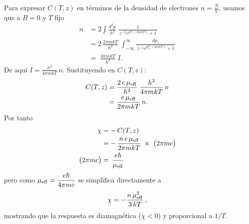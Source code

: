 \documentclass{report}
\begin{document}
Para expresar \(C(T,z)\) en términos de la densidad de electrones
\(\displaystyle n=\frac{N}{V}\), usamos que a \(B=0\) y \(T\) fijo
\begin{align*}
n
  &=2\int\frac{d^3p}{h^3}\;\frac{1}{\,z^{-1}e^{p^2/(2mkT)}+1\,}\\
  &=2\,\frac{2\pi m kT}{h^2}\;
\int_{-\infty}^{\infty}
\frac{dp_z}{\,z^{-1}e^{p_z^2/(2mkT)}+1\,}\\
  &=\;\frac{4\pi m kT}{h^2}\;I.
\end{align*}
De aquí
\(\displaystyle I=\frac{h^2}{4\pi m kT}\,n\). Sustituyendo en \(C(T,z)\):
\begin{align*}
C(T,z)
&=\frac{2\,e\,\mu_{\rm eff}}{h^2}\;
\frac{h^2}{4\pi m kT}\,n\\
&=\frac{e\,\mu_{\rm eff}}{2\pi m kT}\,n.
\end{align*}
Por tanto
\begin{align*}
\chi
  &=-\,C(T,z)\\
  &=-\,\frac{n\,e\,\mu_{\rm eff}}{2\pi m kT}
  \;\times\;\bigl(2\pi m c\bigr)\\
  \bigl(2\pi m c\bigr)&=\,\frac{e\hbar}{\mu_{\rm eff}}
\end{align*}
pero como
\(\displaystyle\mu_{\rm eff}=\frac{e\hbar}{4\pi m c}\)
se simplifica directamente a
\[
\chi
=-\frac{n\,\mu_{\rm eff}^2}{3\,kT}\,,
\]
mostrando que la respuesta es diamagnética (\(\chi<0\)) y proporcional a \(1/T\).

\section{}
\end{document}
